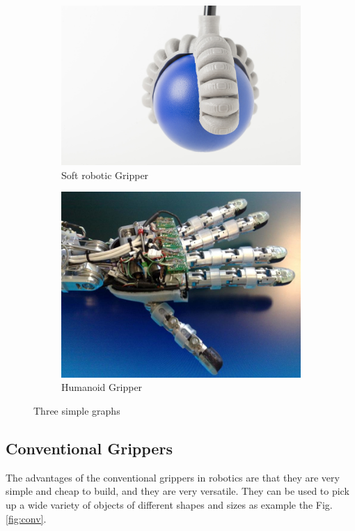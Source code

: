 \documentclass[12pt, twoside]{report}
\begin{document}
\begin{figure}[H]
\begin{subfigure}[b]{0.3\textwidth}
         \includegraphics[width=\textwidth]{images/Project4/gripper2.jpg}
         \caption{Soft robotic Gripper}
         \label{fig:Soft_hand}
     \end{subfigure}
     \hfill
     \begin{subfigure}[b]{0.3\textwidth}
         \centering
         \includegraphics[width=\textwidth]{images/Project4/gripper3.png}
         \caption{Humanoid Gripper}
         \label{fig:Robotic_hand}
     \end{subfigure}
        \caption{Three simple graphs}
        \label{fig:three_Common}
\end{figure}

\subsection{Conventional Grippers}
The advantages of the conventional grippers in robotics are that they are very simple and cheap to build, and they are very versatile. They can be used to pick up a wide variety of objects of different shapes and sizes as example the Fig. \ref{fig:conv}.
\end{document}
